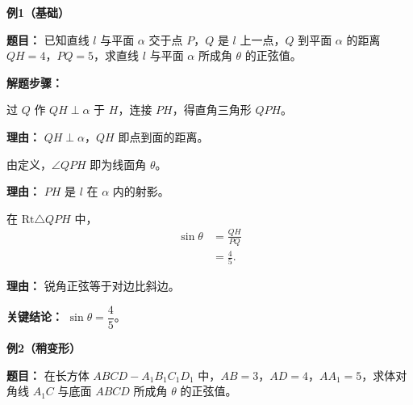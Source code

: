 \begin{examplebox}
	\textbf{\textcolor{CExample}{例1（基础）}}

	\textbf{\textcolor{CExample}{题目：}}
	已知直线 $l$ 与平面 $\alpha$ 交于点 $P$，$Q$ 是 $l$ 上一点，$Q$ 到平面 $\alpha$ 的距离 $QH=4$，$PQ=5$，求直线 $l$ 与平面 $\alpha$ 所成角 $\theta$ 的正弦值。

	\textbf{\textcolor{CExample}{解题步骤：}}
	\begin{description}[style=nextline, leftmargin=2.8em, labelsep=0.5em, itemsep=0.45em]
		\item[\textbf{第一步（作垂线）：}] 过 $Q$ 作 $QH \perp \alpha$ 于 $H$，连接 $PH$，得直角三角形 $QPH$。
			\par\textbf{理由：} $QH \perp \alpha$，$QH$ 即点到面的距离。
		\item[\textbf{第二步（确定线面角）：}] 由定义，$\angle QPH$ 即为线面角 $\theta$。
			\par\textbf{理由：} $PH$ 是 $l$ 在 $\alpha$ 内的射影。
		\item[\textbf{第三步（应用公式）：}] 在 $\mathrm{Rt}\triangle QPH$ 中，
			\[
				\begin{aligned}
					\sin\theta &= \frac{QH}{PQ} \\
					&= \frac{4}{5}.
			\end{aligned}
			\]
			\par\textbf{理由：} 锐角正弦等于对边比斜边。
	\end{description}

	\textbf{\textcolor{CExample}{关键结论：}}
	\textbf{$\sin\theta = \dfrac{4}{5}$}。

	\medskip
	\textbf{\textcolor{CExample}{例2（稍变形）}}

	\textbf{\textcolor{CExample}{题目：}}
	在长方体 $ABCD-A_1B_1C_1D_1$ 中，$AB=3$，$AD=4$，$AA_1=5$，求体对角线 $A_1C$ 与底面 $ABCD$ 所成角 $\theta$ 的正弦值。


\end{examplebox}
